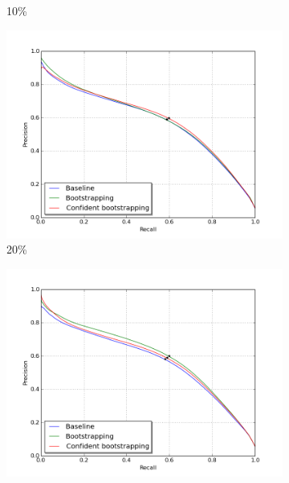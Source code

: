 \begin{figure}[H]
\begin{subfigure}{0.31\textwidth}
\caption{10\% } \label{fig:app_E5_1_pr}
\vspace{0.2cm} %
\end{subfigure}
\hspace*{\fill} %
\begin{subfigure}{0.31\textwidth}
\includegraphics[width=\textwidth]{figs/E5/pr_2.png}
\caption{20\% } \label{fig:app_E5_2_pr}
\vspace{0.2cm} %
\end{subfigure}
\begin{subfigure}{0.31\textwidth}
\includegraphics[width=\textwidth]{figs/E5/pr_3.png}

\end{subfigure}
\end{figure}
